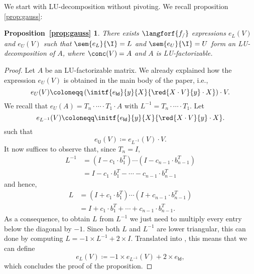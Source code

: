 \newtheorem*{ALU}{Proposition~\ref{prop:gauss}}

We start with LU-decomposition without pivoting. We recall proposition \ref{prop:gauss}:
\begin{ALU}
  There exists $\langforf{f_/}$ expressions $e_L(V)$ and $e_U(V)$ such that
  $\sem{e_L}{\I}=L$ and $\sem{e_U}{\I}=U$ form an LU-decomposition of $A$,
  where $\conc(V)=A$ and $A$ is LU-factorizable.
\end{ALU}
\begin{proof}
	Let $A$ be an LU-factorizable matrix. We already explained how the expression 
	$e_U(V)$ is obtained in the main body of the paper, i.e., 
	$$
	e_{U}(V) \coloneqq   \left( \initf{e_{\mathsf{Id}}}{y}{X}{\red{X\cdot V}{y}\cdot X} \right) \cdot V.
	$$
	We recall that $e_U(A)=T_n\cdot\cdots\cdot T_1\cdot A$ with $L^{-1}=T_n\cdot\cdots\cdot T_1$. Let
	$$
	e_{L^{-1}}(V) \coloneqq   \initf{e_{\mathsf{Id}}}{y}{X}{\red{X\cdot V}{y}\cdot X}.
	$$
such that	$$
	e_{\mathsf{U}}(V) \coloneqq   e_{L^{-1}}(V) \cdot V.
	$$
%
%
It now suffices to observe that, since $T_n=I$,
\begin{align*}
  L^{-1}&=(I-c_1\cdot b_1^T)\cdots (I-c_{n-1}\cdot  b_{n-1}^T) \\
  &=I-c_1\cdot b_1^T-\cdots - c_{n-1}\cdot b_{n-1}^T
\end{align*}
and hence,
\begin{align*}
  L&=(I+c_1\cdot b_1^T)\cdots (I+c_{n-1}\cdot b_{n-1}^T) \\
  &=I+c_1\cdot b_1^T+\cdots + c_{n-1}\cdot b_{n-1}^T.
\end{align*}
As a consequence, to obtain $L$ from $L^{-1}$ we just need to multiply every entry below the diagonal by $-1$. Since both  $L$ and $L^{-1}$ are lower triangular, this can done 
by computing $L=-1\times L^{-1} + 2\times I$. Translated into \langfor, this means that we can define
$$
e_{L}(V) \coloneqq   -1\times e_{L^{-1}}(V) + 2\times e_{\mathsf{Id}},
$$
which concludes the proof of the proposition.
\end{proof}
